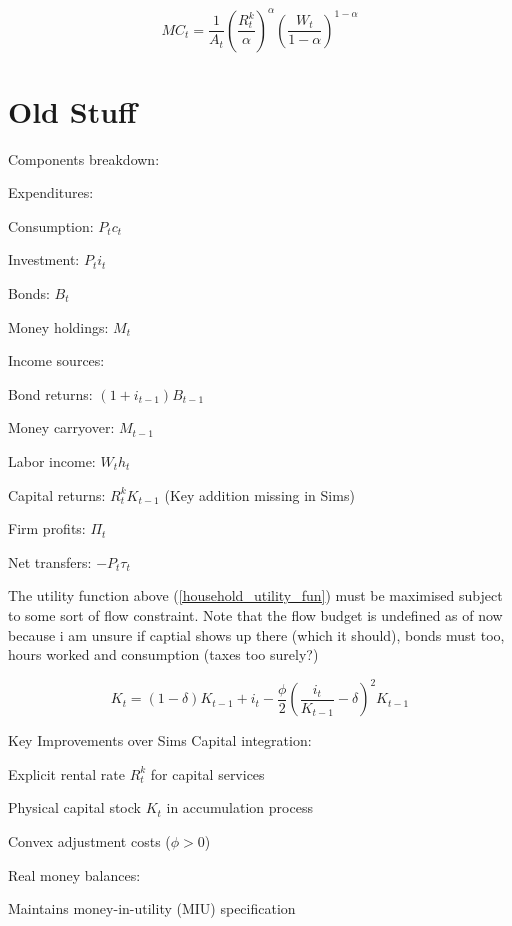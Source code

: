 \documentclass[11pt,preprint]{elsarticle}
\numberwithin{equation}{section}
\numberwithin{figure}{section}
\numberwithin{table}{section}
\begin{document}
\begin{equation}\label{marginal_cost}
\boxed{MC_t = \dfrac{1}{A_t} \left( \dfrac{R_t^k}{\alpha} \right)^{\alpha} \left( \dfrac{W_t}{1-\alpha} \right)^{1-\alpha}}
\end{equation}

\newpage

\newpage

\section{Old Stuff}\label{old-stuff}

Components breakdown:

Expenditures:

Consumption: \(P_t c_t\)

Investment: \(P_t i_t\)

Bonds: \(B_t\)

Money holdings: \(M_t\)

Income sources:

Bond returns: \((1 + i_{t-1}) B_{t-1}\)

Money carryover: \(M_{t-1}\)

Labor income: \(W_t h_t\)

Capital returns: \(R_t^k K_{t-1}\) (Key addition missing in Sims)

Firm profits: \(\Pi_t\)

Net transfers: \(-P_t \tau_t\)

The utility function above (\ref{household_utility_fun}) must be
maximised subject to some sort of flow constraint. Note that the flow
budget is undefined as of now because i am unsure if captial shows up
there (which it should), bonds must too, hours worked and consumption
(taxes too surely?)

\begin{equation}
K_t = (1 - \delta) K_{t-1} + i_t - \frac{\phi}{2} \left( \frac{i_t}{K_{t-1}} - \delta \right)^2 K_{t-1}
\end{equation}

Key Improvements over Sims Capital integration:

Explicit rental rate \(R_t^k\) for capital services

Physical capital stock \(K_t\) in accumulation process

Convex adjustment costs (\(\phi > 0\))

Real money balances:

Maintains money-in-utility (MIU) specification
\end{document}
